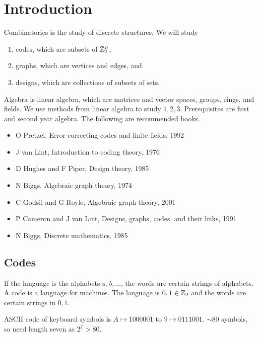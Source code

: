





\section{Introduction}


Combinatorics is the study of discrete structures. We will study
\begin{enumerate}
\item codes, which are subsets of $ \mathbb{Z}_2^n $,
\item graphs, which are vertices and edges, and
\item designs, which are collections of subsets of sets.
\end{enumerate}
Algebra is linear algebra, which are matrices and vector spaces, groups, rings, and fields. We use methods from linear algebra to study $ 1, 2, 3 $. Prerequisites are first and second year algebra. The following are recommended books.
\begin{itemize}
\item O Pretzel, Error-correcting codes and finite fields, 1992
\item J van Lint, Introduction to coding theory, 1976
\item D Hughes and F Piper, Design theory, 1985
\item N Biggs, Algebraic graph theory, 1974
\item C Godsil and G Royle, Algebraic graph theory, 2001
\item P Cameron and J van Lint, Designs, graphs, codes, and their links, 1991
\item N Biggs, Discrete mathematics, 1985
\end{itemize}

\subsection{Codes}

If the language is the alphabets $ a, b, \dots $, the words are certain strings of alphabets. A code is a language for machines. The language is $ 0, 1 \in \mathbb{Z}_2 $ and the words are certain strings in $ 0, 1 $.

\begin{example*}
ASCII code of keyboard symbols is $ A \mapsto 1000001 $ to $ 9 \mapsto 0111001 $. $ \sim80 $ symbols, so need length seven as $ 2^7 > 80 $.
\end{example*}

